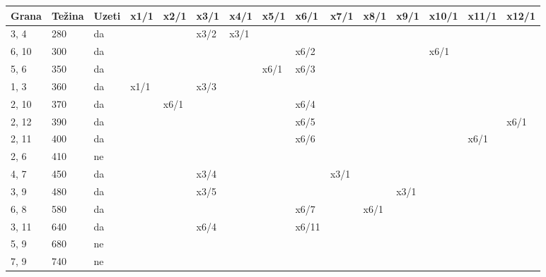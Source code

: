 \documentclass[12pt]{article}
\begin{document}
\begin{table}[hp]
\centering
\hspace*{-1.3in}
\begin{tabular}{|l|l|l|l|l|l|l|l|l|l|l|l|l|l|l|}
\hline
Grana  & Težina & Uzeti & x1/1 & x2/1 & x3/1 & x4/1 & x5/1 & x6/1  & x7/1 & x8/1 & x9/1 & x10/1 & x11/1 & x12/1 \\ \hline
3, 4   & 280    & da    &      &      & x3/2 & x3/1 &      &       &      &      &      &       &       &       \\ \hline
6, 10  & 300    & da    &      &      &      &      &      & x6/2  &      &      &      & x6/1  &       &       \\ \hline
5, 6   & 350    & da    &      &      &      &      & x6/1 & x6/3  &      &      &      &       &       &       \\ \hline
1, 3   & 360    & da    & x1/1 &      & x3/3 &      &      &       &      &      &      &       &       &       \\ \hline
2, 10  & 370    & da    &      & x6/1 &      &      &      & x6/4  &      &      &      &       &       &       \\ \hline
2, 12  & 390    & da    &      &      &      &      &      & x6/5  &      &      &      &       &       & x6/1  \\ \hline
2, 11  & 400    & da    &      &      &      &      &      & x6/6  &      &      &      &       & x6/1  &       \\ \hline
2, 6   & 410    & ne    &      &      &      &      &      &       &      &      &      &       &       &       \\ \hline
4, 7   & 450    & da    &      &      & x3/4 &      &      &       & x3/1 &      &      &       &       &       \\ \hline
3, 9   & 480    & da    &      &      & x3/5 &      &      &       &      &      & x3/1 &       &       &       \\ \hline
6, 8   & 580    & da    &      &      &      &      &      & x6/7  &      & x6/1 &      &       &       &       \\ \hline
3, 11  & 640    & da    &      &      & x6/4 &      &      & x6/11 &      &      &      &       &       &       \\ \hline
5, 9   & 680    & ne    &      &      &      &      &      &       &      &      &      &       &       &       \\ \hline
7, 9   & 740    & ne    &      &      &      &      &      &       &      &      &      &       &       &       \\ \hline

\end{tabular}
\end{table}
\end{document}
